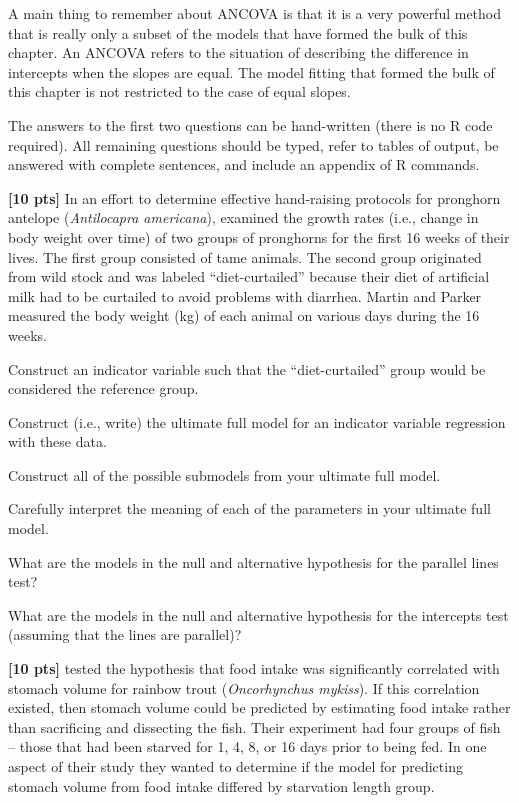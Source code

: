 \documentclass[10pt,openany]{book}\usepackage[]{graphicx}\usepackage[]{color}
\begin{document}
A main thing to remember about ANCOVA is that it is a very powerful method that is really only a subset of the models that have formed the bulk of this chapter.  An ANCOVA refers to the situation of describing the difference in intercepts when the slopes are equal.  The model fitting that formed the bulk of this chapter is not restricted to the case of equal slopes.

\vspace{36pt}
\begin{hwsection}{The answers to the first two questions can be hand-written (there is no R code required).  All remaining questions should be typed, refer to tables of output, be answered with complete sentences, and include an appendix of R commands.}

  \item \label{hwprob:LMIVRPronghorn1} \textbf{[10 pts]} In an effort to determine effective hand-raising protocols for pronghorn antelope (\emph{Antilocapra americana}), \cite{MartinParker1997} examined the growth rates (i.e., change in body weight over time) of two groups of pronghorns for the first 16 weeks of their lives.  The first group consisted of tame animals.  The second group originated from wild stock and was labeled ``diet-curtailed'' because their diet of artificial milk had to be curtailed to avoid problems with diarrhea.  Martin and Parker measured the body weight (kg) of each animal on various days during the 16 weeks.

    \begin{Enumerate}
      \item Construct an indicator variable such that the ``diet-curtailed'' group would be considered the reference group.
      \item Construct (i.e., write) the ultimate full model for an indicator variable regression with these data.
      \item Construct all of the possible submodels from your ultimate full model.
      \item Carefully interpret the meaning of each of the parameters in your ultimate full model.
      \item What are the models in the null and alternative hypothesis for the parallel lines test?
      \item What are the models in the null and alternative hypothesis for the intercepts test (assuming that the lines are parallel)?
    \end{Enumerate}

  \item \label{hwprob:LMIVRStomach1} \textbf{[10 pts]} \cite{PirhonenKoskela2005} tested the hypothesis that food intake was significantly correlated with stomach volume for rainbow trout (\emph{Oncorhynchus mykiss}).  If this correlation existed, then stomach volume could be predicted by estimating food intake rather than sacrificing and dissecting the fish.  Their experiment had four groups of fish -- those that had been starved for 1, 4, 8, or 16 days prior to being fed.  In one aspect of their study they wanted to determine if the model for predicting stomach volume from food intake differed by starvation length group.


\end{hwsection}
\end{document}
